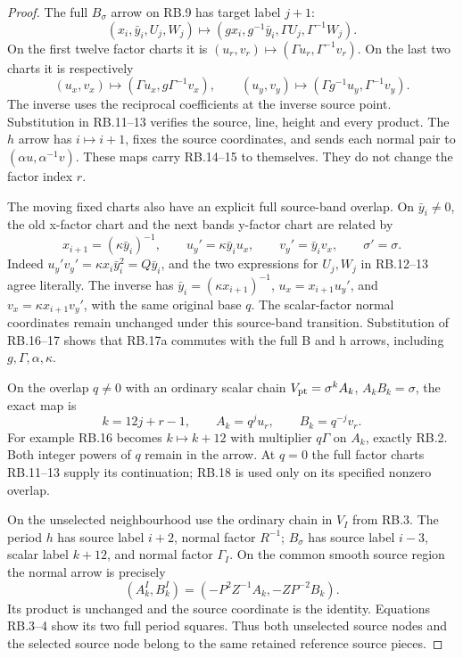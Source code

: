 \begin{proof}
\par\nobreak

The full \(B_\sigma\) arrow on RB.9 has target label \(j+1\):
\[
 (x_i,\bar y_i,U_j,W_j)\longmapsto
        (gx_i,g^{-1}\bar y_i,\Gamma U_j,\Gamma^{-1}W_j).
 \tag{RB.16}
\]
On the first twelve factor charts it is
\((u_r,v_r)\mapsto(\Gamma u_r,\Gamma^{-1}v_r)\).
On the last two charts it is respectively
\[
 (u_x,v_x)\longmapsto(\Gamma u_x,g\Gamma^{-1}v_x),
 \qquad
 (u_y,v_y)\longmapsto(\Gamma g^{-1}u_y,\Gamma^{-1}v_y).
 \tag{RB.17}
\]
The inverse uses the reciprocal coefficients at the inverse source
point. Substitution in RB.11--13 verifies the source, line, height and
every product. The \(h\) arrow has \(i\mapsto i+1\), fixes the
source coordinates, and sends each normal pair to
\((\alpha u,\alpha^{-1}v)\). These maps carry RB.14--15 to themselves.
They do not change the factor index \(r\).

The moving fixed charts also have an explicit full source-band
overlap. On \(\bar y_i\ne0\), the old x-factor chart and the
next band\textquotesingle s y-factor chart are related by
\[
 x_{i+1}=(\kappa\bar y_i)^{-1},\qquad
 u_y'=\kappa\bar y_i u_x,\qquad
 v_y'=\bar y_i v_x,\qquad \sigma'=\sigma.
 \tag{RB.17a}
\]
Indeed \(u_y'v_y'=\kappa x_i\bar y_i^2=Q\bar y_i\),
and the two expressions for \(U_j,W_j\) in RB.12--13 agree
literally. The inverse has
\(\bar y_i=(\kappa x_{i+1})^{-1}\),
\(u_x=x_{i+1}u_y'\), and
\(v_x=\kappa x_{i+1}v_y'\), with the same original base \(q\).
The scalar-factor normal coordinates remain unchanged under
this source-band transition. Substitution of RB.16--17 shows
that RB.17a commutes with the full B and h arrows, including
\(g,\Gamma,\alpha,\kappa\).

On the overlap \(q\ne0\) with an ordinary scalar chain
\(V_{\rm pt}=\sigma^k A_k\), \(A_kB_k=\sigma\), the exact map is
\[
 k=12j+r-1,\qquad A_k=q^j u_r,\qquad B_k=q^{-j}v_r.
 \tag{RB.18}
\]
For example RB.16 becomes \(k\mapsto k+12\) with multiplier
\(q\Gamma\) on \(A_k\), exactly RB.2. Both integer powers of
\(q\) remain in the arrow. At \(q=0\) the full factor charts
RB.11--13 supply its continuation; RB.18 is used only on its
specified nonzero overlap.

On the unselected neighbourhood use the ordinary chain in \(V_I\)
from RB.3. The period \(h\) has source label \(i+2\), normal
factor \(R^{-1}\); \(B_\sigma\) has source label \(i-3\), scalar
label \(k+12\), and normal factor \(\Gamma_I\). On the common
smooth source region the normal arrow is precisely
\[
 (A_k^I,B_k^I)=(-P^2Z^{-1}A_k,-ZP^{-2}B_k).
 \tag{RB.19}
\]
Its product is unchanged and the source coordinate is the identity.
Equations RB.3--4 show its two full period squares. Thus both
unselected source nodes and the selected source node belong to the
same retained reference source pieces.


\end{proof}
